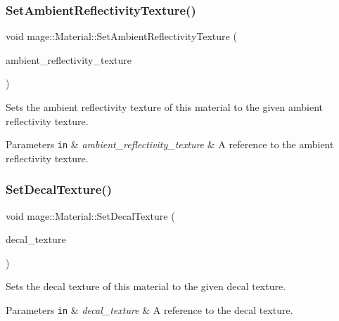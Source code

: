 \subsubsection{\texorpdfstring{Set\+Ambient\+Reflectivity\+Texture()}{SetAmbientReflectivityTexture()}}
{\footnotesize\ttfamily void mage\+::\+Material\+::\+Set\+Ambient\+Reflectivity\+Texture (\begin{DoxyParamCaption}\item[{\hyperlink{namespacemage_a1e01ae66713838a7a67d30e44c67703e}{Shared\+Ptr}$<$ \hyperlink{classmage_1_1_texture}{Texture} $>$}]{ambient\+\_\+reflectivity\+\_\+texture }\end{DoxyParamCaption})}

Sets the ambient reflectivity texture of this material to the given ambient reflectivity texture.


\begin{DoxyParams}[1]{Parameters}
\mbox{\tt in}  & {\em ambient\+\_\+reflectivity\+\_\+texture} & A reference to the ambient reflectivity texture. \\
\hline
\end{DoxyParams}
\hypertarget{structmage_1_1_material_ad52bf9c9d802fce7f7ec47f35a44d180}{}\label{structmage_1_1_material_ad52bf9c9d802fce7f7ec47f35a44d180} 
\subsubsection{\texorpdfstring{Set\+Decal\+Texture()}{SetDecalTexture()}}
{\footnotesize\ttfamily void mage\+::\+Material\+::\+Set\+Decal\+Texture (\begin{DoxyParamCaption}\item[{\hyperlink{namespacemage_a1e01ae66713838a7a67d30e44c67703e}{Shared\+Ptr}$<$ \hyperlink{classmage_1_1_texture}{Texture} $>$}]{decal\+\_\+texture }\end{DoxyParamCaption})}

Sets the decal texture of this material to the given decal texture.


\begin{DoxyParams}[1]{Parameters}
\mbox{\tt in}  & {\em decal\+\_\+texture} & A reference to the decal texture. \\
\hline
\end{DoxyParams}
\hypertarget{structmage_1_1_material_aef82ef4eba08eabc31989144316a57c6}{}\label{structmage_1_1_material_aef82ef4eba08eabc31989144316a57c6} 
